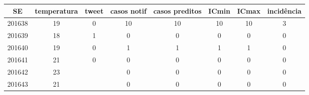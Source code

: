 \begin{tabular}{c|ccccccc}
  \hline
SE & temperatura & tweet & casos notif & casos preditos & ICmin & ICmax & incidência \\ 
  \hline
201638 & 19 & 0 & 10 & 10 & 10 & 10 & 3 \\ 
  201639 & 18 & 1 & 0 & 0 & 0 & 0 & 0 \\ 
  201640 & 19 & 0 & 1 & 1 & 1 & 1 & 0 \\ 
  201641 & 21 & 0 & 0 & 0 & 0 & 0 & 0 \\ 
  201642 & 23 &  & 0 & 0 & 0 & 0 & 0 \\ 
  201643 & 21 &  & 0 & 0 & 0 & 0 & 0 \\ 
   \hline
\end{tabular}
